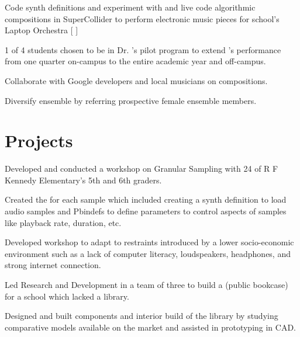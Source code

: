 \documentclass[]{deedy-resume-openfont}
\begin{document}
\begin{minipage}[t]{0.66\textwidth}
\begin{tightemize}
\item Code synth definitions and experiment with and live code algorithmic compositions in SuperCollider to perform electronic music pieces for school's Laptop Orchestra [ \href{https://www.youtube.com/watch?v=UorZXvhU6uI}{}] \item 1 of 4 students chosen to be in Dr.  \href{https://works.bepress.com/bruno-ruviaro/about/}{}'s pilot program to extend \href{https://www.youtube.com/watch?v=UorZXvhU6uI}{}'s performance from one quarter on-campus to the entire academic year and off-campus. \item Collaborate with Google developers and local musicians on compositions.\item Diversify ensemble by referring prospective female ensemble members. \end{tightemize}
\section{Projects}
\begin{tightemize}
\item Developed and conducted a workshop on Granular Sampling with 24 of R F Kennedy Elementary's 5th and 6th graders.  
\item Created the   \href{https://github.com/tanya-sonker/sound-design-workshop}{} for each sample which included creating a synth definition to load audio samples and Pbindefs to define parameters to control aspects of samples like playback rate, duration, etc.   
\item Developed workshop to adapt to restraints introduced by a lower socio-economic environment such as a lack of computer literacy, loudspeakers, headphones, and strong internet connection.
\end{tightemize}
\sectionsep

\begin{tightemize}
\item Led Research and Development in a team of three to build a \href{https://littlefreelibrary.org}{}(public bookcase) for a school which lacked a library.
\item Designed and built components and interior build of the library by studying comparative models available on the market and assisted in prototyping in CAD.
\end{tightemize}


\end{minipage}
\end{document}
